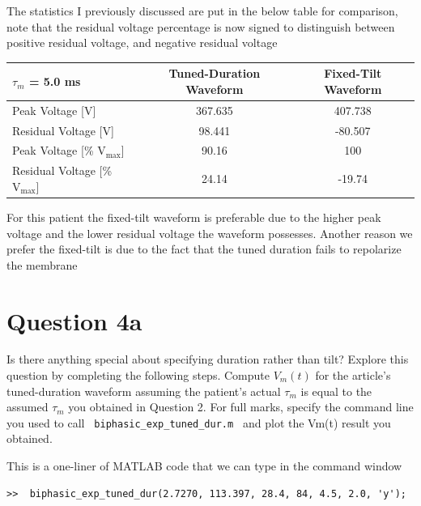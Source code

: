 \documentclass[]{report}
\begin{document}
The statistics I previously discussed are put in the below table for comparison, note that the residual voltage percentage is now signed to distinguish between positive residual voltage, and negative residual voltage

\begin{table}[H]
	\centering
	\begin{tabular}{@{}lcc@{}}
		\toprule
		$\tau_m$ = 5.0 ms                     & Tuned-Duration Waveform & Fixed-Tilt Waveform \\ \midrule
		Peak Voltage {[}V{]}                  & 367.635                 & 407.738             \\
		Residual Voltage {[}V{]}              & 98.441                  & -80.507             \\
		Peak Voltage {[}\% $\text{V}_\text{max}${]}  & 90.16                   & 100                 \\
		Residual Voltage {[}\% $\text{V}_\text{max}${]} & 24.14                   & -19.74              
	\end{tabular}
\end{table}

For this patient the fixed-tilt waveform is preferable due to the higher peak voltage and the lower residual voltage the waveform possesses. Another reason we prefer the fixed-tilt is due to the fact that the tuned duration fails to repolarize the membrane


\section*{Question 4a}

Is there anything special about specifying duration rather than tilt? Explore this question by 
completing the following steps. Compute $V_m(t)$ for the article’s tuned-duration waveform assuming the patient’s actual $\tau_m$ is equal to the assumed $\tau_m$ you obtained in Question 2. For full marks, specify the command line you used to call \texttt{ biphasic\_exp\_tuned\_dur.m } and plot the Vm(t) result you obtained. 

This is a one-liner of MATLAB code that we can type in the command window

\begin{lstlisting}[style=Matlab-editor, backgroundcolor=\color{smoky}]
>>  biphasic_exp_tuned_dur(2.7270, 113.397, 28.4, 84, 4.5, 2.0, 'y');
\end{lstlisting}
\end{document}
